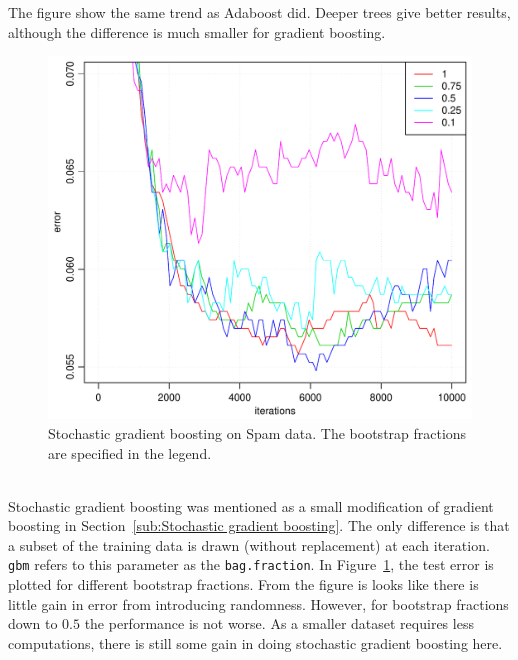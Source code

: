 The figure show the same trend as Adaboost did. Deeper trees give better results, although the difference is much smaller for gradient boosting.
\\
%
\begin{figure}[htbp]
\begin{center}
    \includegraphics[scale=0.5]{./figures/gradboostSpamStoch.pdf}
\end{center}
\caption{Stochastic gradient boosting on Spam data. The bootstrap fractions are specified in the legend.}
\label{fig:StochasticGradBoost}
\end{figure}
\\
Stochastic gradient boosting was mentioned as a small modification of gradient boosting in Section~\ref{sub:Stochastic gradient boosting}. The only difference is that a subset of the training data is drawn (without replacement) at each iteration. \verb+gbm+ refers to this parameter as the \verb+bag.fraction+. In Figure~\ref{fig:StochasticGradBoost}, the test error is plotted for different bootstrap fractions. From the figure is looks like there is little gain in error from introducing randomness. However, for bootstrap fractions down to $0.5$ the performance is not worse. As a smaller dataset requires less computations, there is still some gain in doing stochastic gradient boosting here.

